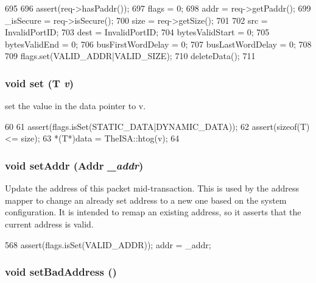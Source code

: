 \begin{DoxyCode}
695     {
696         assert(req->hasPaddr());
697         flags = 0;
698         addr = req->getPaddr();
699         _isSecure = req->isSecure();
700         size = req->getSize();
701 
702         src = InvalidPortID;
703         dest = InvalidPortID;
704         bytesValidStart = 0;
705         bytesValidEnd = 0;
706         busFirstWordDelay = 0;
707         busLastWordDelay = 0;
708 
709         flags.set(VALID_ADDR|VALID_SIZE);
710         deleteData();
711     }
\end{DoxyCode}
\hypertarget{classPacket_a64d947d8dd285398050238bf26c1d8d2}{
\subsubsection[{set}]{\setlength{\rightskip}{0pt plus 5cm}void set (T {\em v})}}
\label{classPacket_a64d947d8dd285398050238bf26c1d8d2}
set the value in the data pointer to v. 


\begin{DoxyCode}
60 {
61     assert(flags.isSet(STATIC_DATA|DYNAMIC_DATA));
62     assert(sizeof(T) <= size);
63     *(T*)data = TheISA::htog(v);
64 }
\end{DoxyCode}
\hypertarget{classPacket_ac449086ed3ddac64f5f55926907b6b0c}{
\subsubsection[{setAddr}]{\setlength{\rightskip}{0pt plus 5cm}void setAddr ({\bf Addr} {\em \_\-addr})}}
\label{classPacket_ac449086ed3ddac64f5f55926907b6b0c}
Update the address of this packet mid-\/transaction. This is used by the address mapper to change an already set address to a new one based on the system configuration. It is intended to remap an existing address, so it asserts that the current address is valid. 


\begin{DoxyCode}
568 { assert(flags.isSet(VALID_ADDR)); addr = _addr; }
\end{DoxyCode}
\hypertarget{classPacket_a44c3e4fcce6474af8052d68e75826c13}{
\subsubsection[{setBadAddress}]{\setlength{\rightskip}{0pt plus 5cm}void setBadAddress ()}}
\label{classPacket_a44c3e4fcce6474af8052d68e75826c13}



